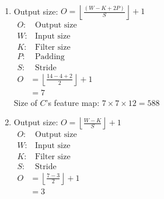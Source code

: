 \documentclass[12pt]{article}
\newenvironment{solution}[2][Solution]{\begin{trivlist}
\item[\hskip \labelsep {\bfseries #1}]}{\end{trivlist}}
\begin{document}
\begin{solution}{}~
\begin{enumerate}[label=\alph*)]
\item Output size: $O=\left\lfloor\frac{(W-K+2P)}{S}\right\rfloor+1$\\
$\begin{array}{rl}
O: & \text{Output size}\\
W: & \text{Input size}\\
K: & \text{Filter size}\\
P: & \text{Padding}\\
S: & \text{Stride}
\end{array}$\\

$\begin{aligned}
O&=\left\lfloor\frac{14-4+2}{2}\right\rfloor+1\\
&=7
\end{aligned}$\\

Size of $C$'s feature map: $7\times7\times12=588$
\item Output size: $O=\left\lfloor\frac{W-K}{S}\right\rfloor+1$\\
$\begin{array}{rl}
O: & \text{Output size}\\
W: & \text{Input size}\\
K: & \text{Filter size}\\
S: & \text{Stride}
\end{array}$\\

$\begin{aligned}
O&=\left\lfloor\frac{7-3}{2}\right\rfloor+1\\
&=3
\end{aligned}$\\


\end{enumerate}
\end{solution}
\end{document}
